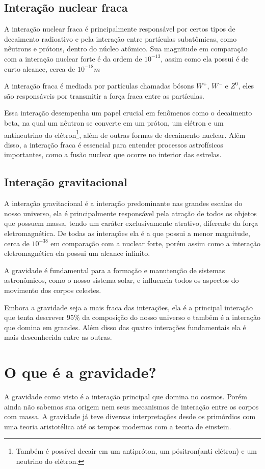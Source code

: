 \documentclass[
	article,			%
	11pt,				%
	twoside,			%
	a4paper,			%
	english,			%
	brazil,				%
	sumario=tradicional
	]{abntex2}
\begin{document}
\subsection*{Interação nuclear fraca}

A interação nuclear fraca é principalmente responsável por certos tipos de decaimento radioativo e pela interação entre partículas subatômicas, como nêutrons e prótons, dentro do núcleo atômico. Sua magnitude em comparação com a interação nuclear forte é da ordem de $10^{-13}$, assim como ela possui é de curto alcance, cerca de $10^{-18}m$

A interação fraca é mediada por partículas chamadas bósons $W^+$, $W^-$ e $Z^0$, eles são responsáveis por transmitir a força fraca entre as partículas.

Essa interação desempenha um papel crucial em fenômenos como o decaimento beta, na qual um nêutron se converte em um próton, um elétron e um antineutrino do elétron\footnote{Também é possível decair em um antipróton, um pósitron(anti elétron) e um neutrino do elétron.}, além de outras formas de decaimento nuclear. Além disso, a interação fraca é essencial para entender processos astrofísicos importantes, como a fusão nuclear que ocorre no interior das estrelas.

\subsection*{Interação gravitacional}

A interação gravitacional é a interação predominante nas grandes escalas do nosso universo, ela é principalmente responsável pela atração de todos os objetos que possuem massa, tendo um caráter exclusivamente atrativo, diferente da força	eletromagnética. De todas as interações ela é a que possui a menor magnitude, cerca de $10^{-38}$ em comparação com a nuclear forte, porém assim como a interação eletromagnética ela possui um alcance infinito.

A gravidade é fundamental para a formação e manutenção de sistemas astronômicos, como o nosso sistema solar, e influencia todos os aspectos do movimento dos corpos celestes.

Embora a gravidade seja a mais fraca das interações, ela é a principal interação que tenta descrever $95\%$ da composição do nosso universo e também é a interação que domina em grandes. Além disso das quatro interações fundamentais ela é mais desconhecida entre as outras.


\section{O que é a gravidade?}
A gravidade como visto é a interação principal que domina no cosmos. Porém ainda não sabemos sua origem nem seus mecanismos de interação entre os corpos com massa. A gravidade já teve diversas interpretações desde os primórdios com uma teoria aristotélica até os tempos modernos com a teoria de einstein.
\end{document}
